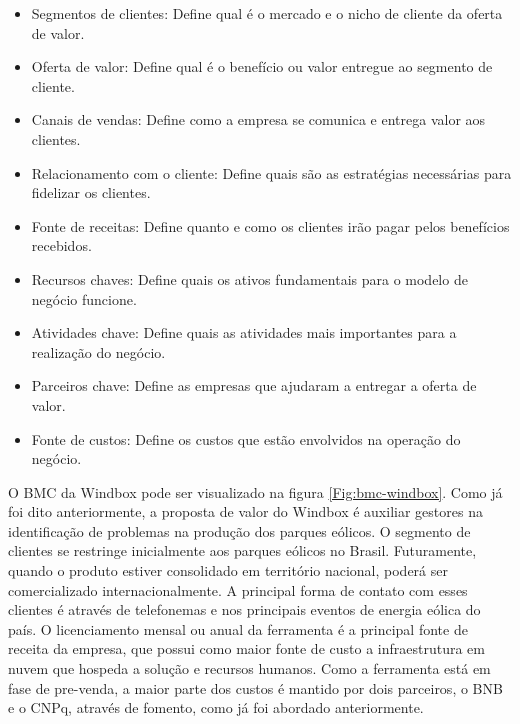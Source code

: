 \begin{itemize}
    \item Segmentos de clientes: Define qual é o mercado e o nicho de cliente da oferta de valor.
    \item Oferta de valor: Define qual é o benefício ou valor entregue ao segmento de cliente.
    \item Canais de vendas: Define como a empresa se comunica e entrega valor aos clientes.
    \item Relacionamento com o cliente: Define quais são as estratégias necessárias para fidelizar os clientes.
    \item Fonte de receitas: Define quanto e como os clientes irão pagar pelos benefícios recebidos.
    \item Recursos chaves: Define quais os ativos fundamentais para o modelo de negócio funcione.
    \item Atividades chave: Define quais as atividades mais importantes para a realização do negócio.
    \item Parceiros chave: Define as empresas que ajudaram a entregar a oferta de valor.
    \item Fonte de custos: Define os custos que estão envolvidos na operação do negócio.
\end{itemize}

O BMC da Windbox pode ser visualizado na figura \ref{Fig:bmc-windbox}. Como já foi dito anteriormente, a proposta de valor do Windbox é auxiliar gestores na identificação de problemas na produção dos parques eólicos. O segmento de clientes se restringe inicialmente aos parques eólicos no Brasil. Futuramente, quando o produto estiver consolidado em território nacional, poderá ser comercializado internacionalmente. A principal forma de contato com esses clientes é através de telefonemas e nos principais eventos de energia eólica do país. O licenciamento mensal ou anual da ferramenta é a principal fonte de receita da empresa, que possui como maior fonte de custo a infraestrutura em nuvem que hospeda a solução e recursos humanos. Como a ferramenta está em fase de pre-venda, a maior parte dos custos é mantido por dois parceiros, o BNB e o CNPq, através de fomento, como já foi abordado anteriormente.

